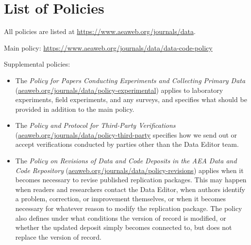 \section{List of Policies}
\label{sec:list-of-policies}

All policies are listed at \url{https://www.aeaweb.org/journals/data}.

Main policy: \url{https://www.aeaweb.org/journals/data/data-code-policy}

Supplemental policies:
\begin{itemize}
    \item The \textit{ Policy for Papers Conducting Experiments and Collecting Primary Data} (\href{https://www.aeaweb.org/journals/data/policy-experimental}{aeaweb.org/journals/data/policy-experimental}) applies to laboratory experiments, field experiments, and any surveys, and specifies what should be provided in addition to the main policy.
    \item The \textit{Policy and Protocol for Third-Party Verifications} (\href{https://www.aeaweb.org/journals/data/policy-third-party}{aeaweb.org/journals/data/policy-third-party} specifies how we send out or accept verifications conducted by parties other than the Data Editor team.
    \item The \textit{Policy on Revisions of Data and Code Deposits in the AEA Data and Code Repository} (\href{https://www.aeaweb.org/journals/data/policy-revisions}{aeaweb.org/journals/data/policy-revisions}) applies when it becomes necessary to revise published replication packages. This may happen when readers and researchers contact the Data Editor, when authors identify a problem, correction, or improvement themselves, or when it becomes necessary for whatever reason to modify the replication package. The policy also defines under what conditions the version of record is modified, or whether the updated deposit simply becomes connected to, but does not replace the version of record.
\end{itemize}